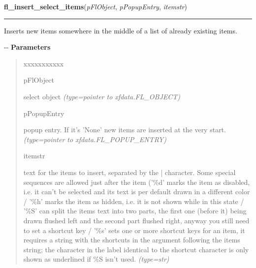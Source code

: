     \label{xformslib:flselect:fl_insert_select_items}

    \vspace{0.5ex}

\hspace{.8\funcindent}\begin{boxedminipage}{\funcwidth}

    \raggedright \textbf{fl\_insert\_select\_items}(\textit{pFlObject}, \textit{pPopupEntry}, \textit{itemstr})

    \vspace{-1.5ex}

    \rule{\textwidth}{0.5\fboxrule}
\setlength{\parskip}{2ex}

Inserts new items somewhere in the middle of a list of already existing
items.

-{}-
\setlength{\parskip}{1ex}
      \textbf{Parameters}
      \vspace{-1ex}

      \begin{quote}
        \begin{Ventry}{xxxxxxxxxxx}

          \item[pFlObject]


select object
            {\it (type=pointer to xfdata.FL\_OBJECT)}

          \item[pPopupEntry]


popup entry. If it's 'None' new items are inserted at the very start.
            {\it (type=pointer to xfdata.FL\_POPUP\_ENTRY)}

          \item[itemstr]


text for the items to insert, separated by the | character. Some
special sequences are allowed just after the item ('\%d' marks the item
as disabled, i.e. it can't be selected and its text is per default
drawn in a different color / '\%h' marks the item as hidden, i.e. it
is not shown while in this state / '\%S' can split the items text into
two parts, the first one (before it) being drawn flushed left and the
second part flushed right, anyway you still need to set a shortcut key
/ '\%s' sets one or more shortcut keys for an item, it requires a
string with the shortcuts in the argument following the items string;
the character in the label identical to the shortcut character is only
shown as underlined if \%S isn't used.
            {\it (type=str)}


\end{Ventry}
\end{quote}
\end{boxedminipage}
